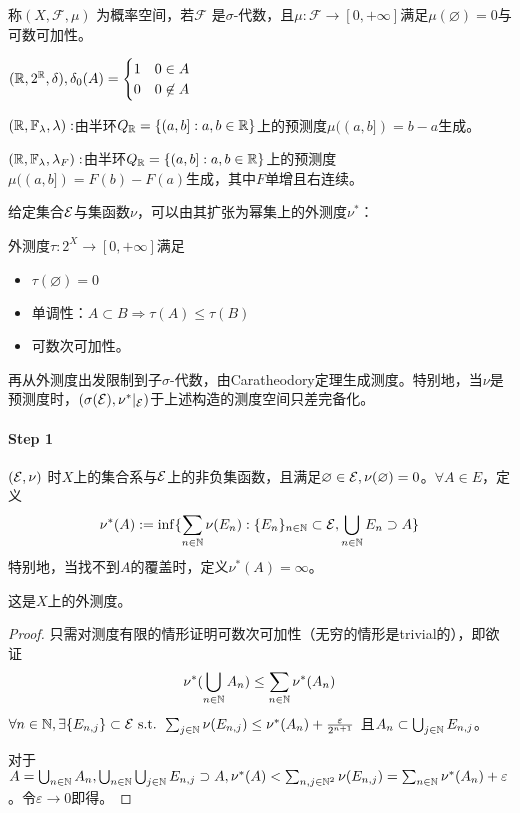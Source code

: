 \documentclass{ctexbook}
\begin{document}
\begin{Def}[概率空间]
  称$(X,\mathcal{F},\mu)$ 为概率空间，若$\mathcal{F}$ 是$\sigma$-代数，且$\mu:\mathcal{F}\to [0,+\infty]$满足$\mu(\varnothing)=0$与可数可加性。
\end{Def}
\begin{Eg}[Dirac测度]
  $(\mathbb{R},2^{\mathbb{R}},\delta),\delta_{0}(A)=\begin{cases}1&0\in A\\0&0\not\in A\end{cases}$
\end{Eg}
\begin{Eg}[Lebesgue测度]
  $(\mathbb{R},\mathbb{F}_{\lambda},\lambda):$由半环$Q_{\mathbb{R}}=\{(a,b]:a,b\in\mathbb{R}\}$上的预测度$\mu((a,b])=b-a$生成。
\end{Eg}

\begin{Eg}
  $(\mathbb{R},\mathbb{F}_{\lambda},\lambda_{F}):$由半环$Q_{\mathbb{R}}=\{(a,b]:a,b\in\mathbb{R}\}$上的预测度$\mu((a,b])=F(b)-F(a)$生成，其中$F$单增且右连续。  
\end{Eg}

给定集合$\mathcal{E}$与集函数$\nu$，可以由其扩张为幂集上的外测度$\nu^{*}$：
\begin{Def}[外测度]
  外测度$\tau:2^{X}\to[0,+\infty]$满足
  \begin{itemize}
  \item $\tau(\varnothing)=0$
  \item 单调性：$A\subset B\Rightarrow \tau(A)\leq \tau(B)$
  \item 可数次可加性。
  \end{itemize}
\end{Def}

再从外测度出发限制到子$\sigma$-代数，由Caratheodory定理生成测度。特别地，当$\nu$是预测度时，$(\sigma(\mathcal{E}),\nu^{*}|_{\mathcal{E}})$于上述构造的测度空间只差完备化。

\paragraph{Step 1}
\begin{Prop}
  $(\mathcal{E},\nu)$ 时$X$上的集合系与$\mathcal{E}$上的非负集函数，且满足$\varnothing\in\mathcal{E},\nu(\varnothing)=0$。$\forall A\in E$，定义
  \[\nu^{*}(A):=\inf\{\sum_{n\in \mathbb{N}}\nu(E_{n}):\{E_{n}\}_{n\in\mathbb{N}}\subset\mathcal{E},\bigcup_{n\in\mathbb{N}}E_{n}\supset A\}\]
  特别地，当找不到$A$的覆盖时，定义$\nu^{*}(A)=\infty$。

  这是$X$上的外测度。
\end{Prop}

\begin{proof}
  只需对测度有限的情形证明可数次可加性（无穷的情形是trivial的），即欲证
  \[\nu^{*}(\bigcup_{n\in\mathbb{N}}A_{n})\leq \sum_{n\in\mathbb{N}}\nu^{*}(A_{n})\]
  $\forall n\in \mathbb{N},\exists \{E_{n,j}\}\subset \mathcal{E}\text{ s.t. } \sum_{j\in\mathbb{N}}\nu(E_{n,j})\leq \nu^{*}(A_{n})+\frac{\varepsilon}{2^{n+1}}$ 且$A_{n}\subset \bigcup_{j\in\mathbb{N}}E_{n,j}$。

  对于$A=\bigcup_{n\in \mathbb{N}}A_{n}, \bigcup_{n\in\mathbb{N}}\bigcup_{j\in \mathbb{N}}E_{n,j}\supset A,\nu^{*}(A)<\sum_{n,j\in\mathbb{N}^{2}}\nu(E_{n,j})=\sum_{n\in\mathbb{N}}\nu^{*}(A_{n})+\varepsilon$。令$\varepsilon\to 0$即得。
\end{proof}
\end{document}

